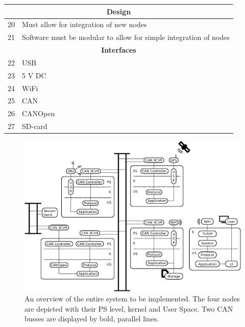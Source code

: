\begin{table}[H]
\begin{tabular}{ |p{0.3cm}|p{10.5cm}| }
\hline
\multicolumn{2}{|c|}{\textbf{Design}}\\
\hline	
20 & Must allow for integration of new nodes		 					 \\
21 & Software must be modular to allow for simple integration of nodes	 \\

\hline
\multicolumn{2}{|c|}{\textbf{Interfaces}}\\
\hline	
22 & USB 		 						\\
23 & 5 V DC		 						\\
24 & WiFi	 							\\
25 & CAN 		 						\\
26 & CANOpen 		 					\\
27 & SD-card 		 					\\
\hline
\end{tabular}
\end{table}

\newpage
\begin{figure}[!h]
	\centering
	\includegraphics[angle=90,width=\textwidth]{graphics/analysis_complex.eps}
	\caption{An overview of the entire system to be implemented. The four nodes are depicted with their PS level, kernel and User Space. Two CAN busses are displayed by bold, parallel lines.}
	\label{fig:complete_system}
\end{figure}


